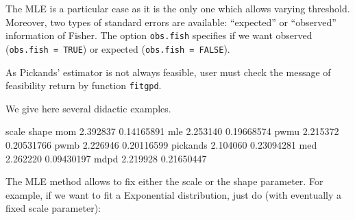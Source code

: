 \documentclass[a4paper]{article}
\numberwithin{equation}{section}
\theoremstyle{definition}
\begin{document}
The MLE is a particular case as it is the only one which allows
varying threshold. Moreover, two types of standard errors are
available: ``expected'' or ``observed'' information of Fisher. The
option \verb|obs.fish| specifies if we want observed
(\verb|obs.fish = TRUE|) or expected (\verb|obs.fish = FALSE|).

As Pickands' estimator is not always feasible, user must check the
message of feasibility return by function \verb+fitgpd+.

We give here several didactic examples.
\begin{Schunk}
\begin{Soutput}
            scale      shape
mom      2.392837 0.14165891
mle      2.253140 0.19668574
pwmu     2.215372 0.20531766
pwmb     2.226946 0.20116599
pickands 2.104060 0.23094281
med      2.262220 0.09430197
mdpd     2.219928 0.21650447
\end{Soutput}
\end{Schunk}

The MLE method allows to fix either the scale or the shape
parameter. For example, if we want to fit a Exponential distribution,
just do (with eventually a fixed scale parameter):
\end{document}
